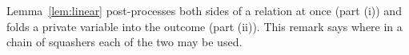 
Lemma~\ref{lem:linear} post-processes both sides of a relation at once
(part (i)) and folds a private variable into the outcome (part (ii)). This
remark says where in a chain of squashers each of the two may be used.

